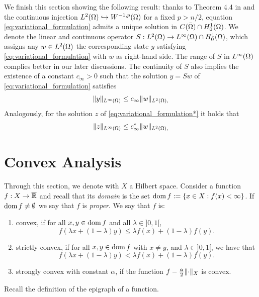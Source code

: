 \begin{remark}\label{rmrk:operator_S}    
We finish this section showing the following result: thanks to Theorem 4.4 in 
\cite{stampacchia65} and the continuous injection $L^2(\Omega) \hookrightarrow W^{-1,p}(\Omega)$ for a fixed
 $p>n/2$, equation \eqref{eq:variational_formulation} admits a unique solution in $C(\bar{\Omega})\cap H_0^1(\Omega)$. 
We denote the linear and continuous operator $S:L^2(\Omega)\to L^{\infty}(\Omega)\cap H_0^1(\Omega)$,
which assigns any $w\in L^2(\Omega)$  the corresponding state $y$  satisfying 
\eqref{eq:variational_formulation} with $w$ as right-hand side. 
The range of $S$ in $L^\infty(\Omega)$ complies better in our later discussions. 
The continuity of $S$ also implies the existence of a constant $c_{\infty}>0$ such that 
the solution $y=Sw$ of \eqref{eq:variational_formulation} satisfies
\begin{equation}\label{eq:esti_state_uniform}
    \lVert y \rVert_{L^{\infty}(\Omega)}\le c_{\infty}\lVert w \rVert_{L^2(\Omega),}
\end{equation}
Analogously, for the solution $z$ of \eqref{eq:variational_formulation*} it holds that 
\begin{equation}\label{eq:esti_state*_uniform}
    \lVert z \rVert_{L^{\infty}(\Omega)}\le c_{\infty}^*\lVert w \rVert_{L^2(\Omega),}
\end{equation}
\end{remark}



\section{Convex Analysis}

Through this section, we denote with $X$ a Hilbert space. Consider a function $f: X\to \overline{\mathbb{R}}$ and recall that its \textit{domain} is the set $\operatorname{dom}{f}:=\{x\in X: f(x)<\infty\}$. If $\operatorname{dom}{f}\ne \emptyset$ we say that $f$ is \textit{proper}. We say that $f$ is:
\begin{enumerate}
    \item convex, if for all $x, y\in \operatorname{dom}{f}$ and all $\lambda\in ]0,1[$,
    \[
   f(\lambda x+(1-\lambda) y)\le \lambda f(x)+(1-\lambda) f(y).
    \]    
    \item strictly convex, if for all $x, y\in \operatorname{dom}{f}$ with $x\ne y$, and $\lambda\in ]0,1[$, we have that
    \[
    f(\lambda x+(1-\lambda) y)<\lambda f(x)+(1-\lambda) f(y).
    \]
    \item strongly convex with constant $\alpha$, if the function $f-\frac{\alpha}{2}\lVert \cdot \rVert_{X}$ is convex.
\end{enumerate}
Recall the definition of the epigraph of a function.

